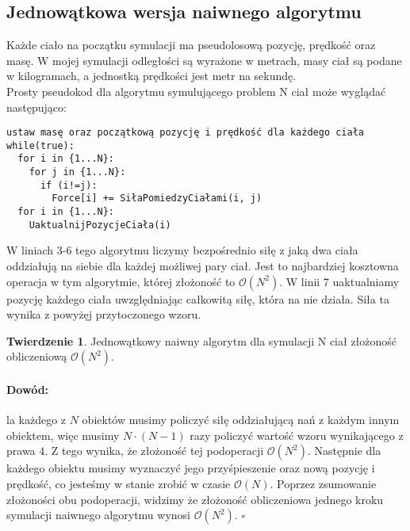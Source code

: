 \documentclass[14pt,twoside,a4paper]{article}
\newenvironment{myproof}[2] {\paragraph{Dowód:}}{\hfill$\square$}
\newcommand\tab[1][1cm]{\hspace*{#1}}
\theoremstyle{definition}
\begin{document}
\subsection{\Large Jednowątkowa wersja naiwnego algorytmu}

Każde ciało na początku symulacji ma pseudolosową pozycję, prędkość oraz masę. W mojej symulacji odległości są wyrażone w metrach, masy ciał są podane w kilogramach, a jednostką prędkości jest metr na sekundę. \\


Prosty pseudokod dla algorytmu symulującego problem N ciał może wyglądać następująco:\\
\bigskip
{}
\begin{lstlisting}[frame=single, framerule=2pt, caption=Pseudokod naiwnego algorytmu]
ustaw masę oraz początkową pozycję i prędkość dla każdego ciała
while(true):
  for i in {1...N}:
    for j in {1...N}:
      if (i!=j):
        Force[i] += SiłaPomiedzyCiałami(i, j) 
  for i in {1...N}:
    UaktualnijPozycjeCiała(i)
\end{lstlisting}

\bigskip

W liniach 3-6 tego algorytmu liczymy bezpośrednio siłę z jaką dwa ciała oddziałują na siebie dla każdej możliwej pary ciał. Jest to najbardziej kosztowna operacja w tym algorytmie, której złożoność to $\mathcal{O}(N^{2})$. W linii 7 uaktualniamy pozycję każdego ciała uwzględniając całkowitą siłę, która na nie działa. Siła ta wynika z powyżęj przytoczonego wzoru. 
\bigskip
\newtheorem{twr}{Twierdzenie}
\begin{twr}
Jednowątkowy naiwny algorytm dla symulacji N ciał złożoność obliczeniową $\mathcal{O}(N^{2})$.
\end{twr}

\begin{myproof}

\tab Dla każdego z $N$ obiektów musimy policzyć siłę oddziałującą nań z każdym innym obiektem, więc musimy $N\cdot (N-1)$ razy policzyć wartość wzoru wynikającego z prawa $4$. Z tego wynika, że złożoność tej podoperacji $\mathcal{O}(N^{2})$. 
Następnie dla każdego obiektu musimy wyznaczyć jego przyśpieszenie oraz nową pozycję i prędkość, co jesteśmy w stanie zrobić w czasie $\mathcal{O}(N)$.
Poprzez zsumowanie złożoności obu podoperacji, widzimy że złożoność obliczeniowa jednego kroku symulacji naiwnego algorytmu wynosi $\mathcal{O}(N^{2})$.
\end{myproof}
\end{document}
